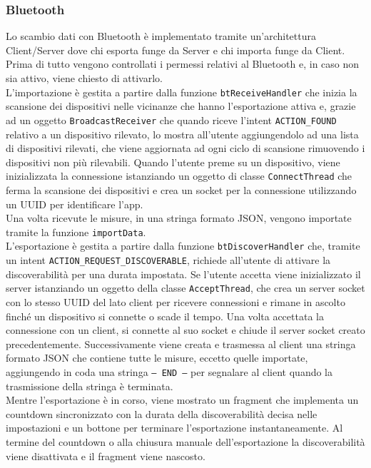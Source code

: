 \documentclass[11pt]{article}
\begin{document}
\subsubsection{Bluetooth}
Lo scambio dati con Bluetooth è implementato tramite un'architettura Client/Server dove chi esporta funge da Server e chi importa funge da Client. \\
Prima di tutto vengono controllati i permessi relativi al Bluetooth e, in caso non sia attivo, viene chiesto di attivarlo. \\
L'importazione è gestita a partire dalla funzione \texttt{btReceiveHandler} che inizia la scansione dei dispositivi nelle vicinanze che hanno l'esportazione attiva e, grazie ad un oggetto \texttt{BroadcastReceiver} che quando riceve l'intent \texttt{ACTION\_FOUND} relativo a un dispositivo rilevato, lo mostra all'utente aggiungendolo ad una lista di dispositivi rilevati, che viene aggiornata ad ogni ciclo di scansione rimuovendo i dispositivi non più rilevabili. Quando l'utente preme su un dispositivo, viene inizializzata la connessione istanziando un oggetto di classe \texttt{ConnectThread} che ferma la scansione dei dispositivi e crea un socket per la connessione utilizzando un UUID per identificare l'app. \\
Una volta ricevute le misure, in una stringa formato JSON, vengono importate tramite la funzione \texttt{importData}. \\
L'esportazione è gestita a partire dalla funzione \texttt{btDiscoverHandler} che, tramite un intent \texttt{ACTION\_REQUEST\_DISCOVERABLE}, richiede all'utente di attivare la discoverabilità per una durata impostata. Se l'utente accetta viene inizializzato il server istanziando un oggetto della classe \texttt{AcceptThread}, che crea un server socket con lo stesso UUID del lato client per ricevere connessioni e rimane in ascolto finché un dispositivo si connette o scade il tempo. Una volta accettata la connessione con un client, si connette al suo socket e chiude il server socket creato precedentemente. Successivamente viene creata e trasmessa al client una stringa formato JSON che contiene tutte le misure, eccetto quelle importate, aggiungendo in coda una stringa \texttt{-- END --} per segnalare al client quando la trasmissione della stringa è terminata. \\
Mentre l'esportazione è in corso, viene mostrato un fragment che implementa un countdown sincronizzato con la durata della discoverabilità decisa nelle impostazioni e un bottone per terminare l'esportazione instantaneamente. Al termine del countdown o alla chiusura manuale dell'esportazione la discoverabilità viene disattivata e il fragment viene nascosto.
\pagebreak
\end{document}
